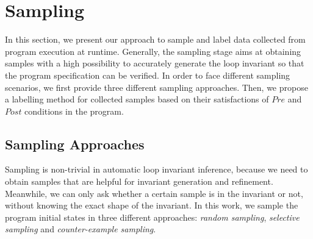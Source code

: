 
\section{Sampling} %
\label{sec:sampling}

In this section, we present our approach to sample and label data 
collected from program execution at runtime. 
Generally, the sampling stage aims at obtaining samples with a high possibility to 
accurately generate the loop invariant so that the program specification can be verified. 
In order to face different sampling scenarios, 
we first provide three different sampling approaches. 
Then, we propose a labelling method for collected samples 
based on their satisfactions of $\mathit{Pre}$ and $\mathit{Post}$ conditions in the program. 

\subsection{Sampling Approaches} %
\label{sub:sampling_approaches}

Sampling is non-trivial in automatic loop invariant inference, 
because we need to obtain samples that are helpful for invariant generation and refinement. 
Meanwhile, we can only ask whether a certain sample is in the invariant or not, 
without knowing the exact shape of the invariant. 
In this work, we sample the program initial states in three different approaches: 
\emph{random sampling}, \emph{selective sampling} and \emph{counter-example sampling}. 

